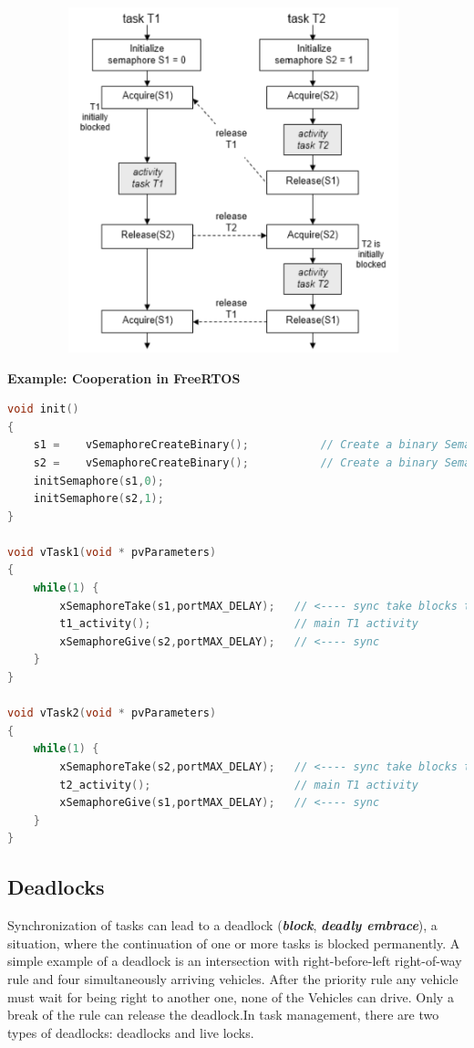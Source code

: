  	\begin{figure}[h]
    \centering
    \includegraphics[width=11cm, height=10cm]{Images/image107.png}
    \label{fig:Fig 53}
    \end{figure}
\newpage
\os{\newpage}
\textbf{Example: Cooperation in FreeRTOS  }

\begin{lstlisting}[style=mystyle, language=c]
void init()
{
	s1 =	vSemaphoreCreateBinary();			// Create a binary Semaphore 
	s2 =	vSemaphoreCreateBinary();			// Create a binary Semaphore 
	initSemaphore(s1,0);  	
	initSemaphore(s2,1);
}

void vTask1(void * pvParameters)
{
	while(1) {
		xSemaphoreTake(s1,portMAX_DELAY);	// <---- sync take blocks task !
		t1_activity();						// main T1 activity
		xSemaphoreGive(s2,portMAX_DELAY);	// <---- sync 
 	}
}

void vTask2(void * pvParameters)
{
	while(1) {
		xSemaphoreTake(s2,portMAX_DELAY);	// <---- sync take blocks task !
		t2_activity();						// main T1 activity
		xSemaphoreGive(s1,portMAX_DELAY);	// <---- sync 
 	}
}
\end{lstlisting}

\subsection{Deadlocks}

Synchronization of tasks can lead to a deadlock (\textbf{\textit{block}}, \textbf{\textit{deadly embrace}}), a situation, where the continuation of one or more tasks is blocked permanently. A simple example of a deadlock is an intersection with right-before-left right-of-way rule and four simultaneously arriving vehicles. After the priority rule any vehicle must wait for being right to another one, none of the Vehicles can drive. Only a break of the rule can release the deadlock.In task management, there are two types of deadlocks: deadlocks and live locks.\\

